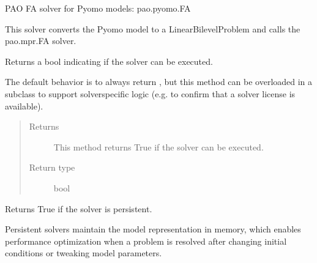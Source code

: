 \documentclass[letterpaper,10pt,english]{sphinxmanual}
\begin{document}
\begin{fulllineitems}
\label{\detokenize{reference/pyomo:pao.pyomo.solvers.mpr_solvers.PyomoSubmodelSolver_FA}}
PAO FA solver for Pyomo models: pao.pyomo.FA

This solver converts the Pyomo model to a LinearBilevelProblem and
calls the pao.mpr.FA solver.

\begin{fulllineitems}
\label{\detokenize{reference/pyomo:pao.pyomo.solvers.mpr_solvers.PyomoSubmodelSolver_FA.available}}
Returns a bool indicating if the solver can be executed.

The default behavior is to always return , but this method
can be overloaded in a subclass to support solver\sphinxhyphen{}specific logic
(e.g.  to confirm that a solver license is available).
\begin{quote}\begin{description}
\item[{Returns}] \leavevmode
This method returns True if the solver can be executed.

\item[{Return type}] \leavevmode
bool

\end{description}\end{quote}

\end{fulllineitems}


\begin{fulllineitems}
\label{\detokenize{reference/pyomo:pao.pyomo.solvers.mpr_solvers.PyomoSubmodelSolver_FA.is_persistent}}
Returns True if the solver is persistent.

Persistent solvers maintain the model representation in memory,
which enables performance optimization when a problem is resolved
after changing initial conditions or tweaking model parameters.


\end{fulllineitems}
\end{fulllineitems}
\end{document}

